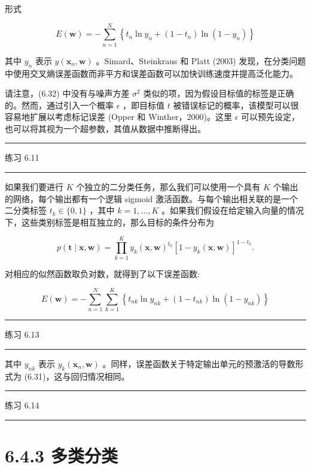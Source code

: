 \documentclass[10pt]{article}
\newcommand{\HRule}{\begin{center}\rule{0.9\linewidth}{0.2mm}\end{center}}
\begin{document}
形式

\[
E\left( \mathbf{w}\right)  =  - \mathop{\sum }\limits_{{n = 1}}^{N}\left\{  {{t}_{n}\ln {y}_{n} + \left( {1 - {t}_{n}}\right) \ln \left( {1 - {y}_{n}}\right) }\right\}   \tag{6.33}
\]

其中 \({y}_{n}\) 表示 \(y\left( {{\mathbf{x}}_{n},\mathbf{w}}\right)\) 。Simard、Steinkraus 和 Platt (2003) 发现，在分类问题中使用交叉熵误差函数而非平方和误差函数可以加快训练速度并提高泛化能力。

请注意，(6.32) 中没有与噪声方差 \({\sigma }^{2}\) 类似的项，因为假设目标值的标签是正确的。然而，通过引入一个概率 \(\epsilon\) ，即目标值 \(t\) 被错误标记的概率，该模型可以很容易地扩展以考虑标记误差 (Opper 和 Winther，2000)。这里 \(\epsilon\) 可以预先设定，也可以将其视为一个超参数，其值从数据中推断得出。

\HRule

练习 6.11

\HRule

如果我们要进行 \(K\) 个独立的二分类任务，那么我们可以使用一个具有 \(K\) 个输出的网络，每个输出都有一个逻辑 sigmoid 激活函数。与每个输出相关联的是一个二分类标签 \({t}_{k} \in  \{ 0,1\}\) ，其中 \(k = 1,\ldots ,K\) 。如果我们假设在给定输入向量的情况下，这些类别标签是相互独立的，那么目标的条件分布为

\[
p\left( {\mathbf{t} \mid  \mathbf{x},\mathbf{w}}\right)  = \mathop{\prod }\limits_{{k = 1}}^{K}{y}_{k}{\left( \mathbf{x},\mathbf{w}\right) }^{{t}_{k}}{\left\lbrack  1 - {y}_{k}\left( \mathbf{x},\mathbf{w}\right) \right\rbrack  }^{1 - {t}_{k}}. \tag{6.34}
\]

对相应的似然函数取负对数，就得到了以下误差函数:

\[
E\left( \mathbf{w}\right)  =  - \mathop{\sum }\limits_{{n = 1}}^{N}\mathop{\sum }\limits_{{k = 1}}^{K}\left\{  {{t}_{nk}\ln {y}_{nk} + \left( {1 - {t}_{nk}}\right) \ln \left( {1 - {y}_{nk}}\right) }\right\}   \tag{6.35}
\]

\HRule

练习 6.13

\HRule

其中 \({y}_{nk}\) 表示 \({y}_{k}\left( {{\mathbf{x}}_{n},\mathbf{w}}\right)\) 。同样，误差函数关于特定输出单元的预激活的导数形式为 (6.31)，这与回归情况相同。

\HRule

练习 6.14

\HRule

\section*{6.4.3 多类分类}
\end{document}
